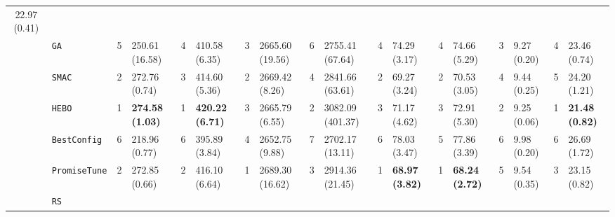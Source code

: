 \begin{tabular}{clllllllllllllllll}
  22.97 (0.41) \\
\multicolumn{1}{c|}{} &
  \multicolumn{1}{l|}{\texttt{GA}} &
  5 &
  \multicolumn{1}{l|}{250.61 (16.58)} &
  4 &
  \multicolumn{1}{l|}{410.58 (6.35)} &
  3 &
  \multicolumn{1}{l|}{2665.60 (19.56)} &
  6 &
  \multicolumn{1}{l|}{2755.41 (67.64)} &
  4 &
  \multicolumn{1}{l|}{74.29 (3.17)} &
  4 &
  \multicolumn{1}{l|}{74.66 (5.29)} &
  3 &
  \multicolumn{1}{l|}{9.27 (0.20)} &
  4 &
  23.46 (0.74) \\
\multicolumn{1}{c|}{} &
  \multicolumn{1}{l|}{\texttt{SMAC}} &
  2 &
  \multicolumn{1}{l|}{272.76 (0.74)} &
  3 &
  \multicolumn{1}{l|}{414.60 (5.36)} &
  2 &
  \multicolumn{1}{l|}{2669.42 (8.26)} &
  4 &
  \multicolumn{1}{l|}{2841.66 (63.61)} &
  2 &
  \multicolumn{1}{l|}{69.27 (3.24)} &
  2 &
  \multicolumn{1}{l|}{70.53 (3.05)} &
  4 &
  \multicolumn{1}{l|}{9.44 (0.25)} &
  5 &
  24.20 (1.21) \\
\multicolumn{1}{c|}{} &
  \multicolumn{1}{l|}{\texttt{HEBO}} &
  \cellcolor{blue!15}1 &
  \multicolumn{1}{l|}{\cellcolor{blue!15}\textbf{274.58 (1.03)}} &
  \cellcolor{blue!15}1 &
  \multicolumn{1}{l|}{\cellcolor{blue!15}\textbf{420.22 (6.71)}} &
  3 &
  \multicolumn{1}{l|}{2665.79 (6.55)} &
  2 &
  \multicolumn{1}{l|}{3082.09 (401.37)} &
  3 &
  \multicolumn{1}{l|}{71.17 (4.62)} &
  3 &
  \multicolumn{1}{l|}{72.91 (5.30)} &
  2 &
  \multicolumn{1}{l|}{9.25 (0.06)} &
  \cellcolor{blue!15}1 &
  \cellcolor{blue!15}\textbf{21.48 (0.82)} \\
\multicolumn{1}{c|}{} &
  \multicolumn{1}{l|}{\texttt{BestConfig}} &
  6 &
  \multicolumn{1}{l|}{218.96 (0.77)} &
  6 &
  \multicolumn{1}{l|}{395.89 (3.84)} &
  4 &
  \multicolumn{1}{l|}{2652.75 (9.88)} &
  7 &
  \multicolumn{1}{l|}{2702.17 (13.11)} &
  6 &
  \multicolumn{1}{l|}{78.03 (3.47)} &
  5 &
  \multicolumn{1}{l|}{77.86 (3.39)} &
  6 &
  \multicolumn{1}{l|}{9.98 (0.20)} &
  6 &
  26.69 (1.72) \\
\multicolumn{1}{c|}{} &
  \multicolumn{1}{l|}{\texttt{PromiseTune}} &
  2 &
  \multicolumn{1}{l|}{272.85 (0.66)} &
  2 &
  \multicolumn{1}{l|}{416.10 (6.64)} &
  \cellcolor{blue!15}1 &
  \multicolumn{1}{l|}{\cellcolor{blue!15}2689.30 (16.62)} &
  3 &
  \multicolumn{1}{l|}{2914.36 (21.45)} &
  \cellcolor{blue!15}1 &
  \multicolumn{1}{l|}{\cellcolor{blue!15}\textbf{68.97 (3.82)}} &
  \cellcolor{blue!15}1 &
  \multicolumn{1}{l|}{\cellcolor{blue!15}\textbf{68.24 (2.72)}} &
  5 &
  \multicolumn{1}{l|}{9.54 (0.35)} &
  3 &
  23.15 (0.82) \\
\multicolumn{1}{c|}{} &
  \multicolumn{1}{l|}{\texttt{RS}} &

\end{tabular}

